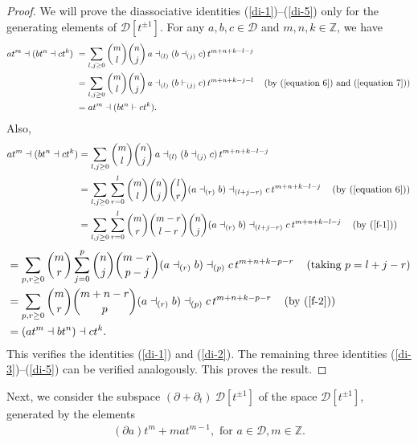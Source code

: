 \documentclass[a4paper,reqno,10pt]{amsart}
\theoremstyle{plain}
\theoremstyle{definition}
\theoremstyle{remark}
\newcommand{\D}{\mathcal{D}}
\begin{document}
\begin{proof}
   We will prove the diassociative identities (\ref{di-1})--(\ref{di-5}) only for the generating elements of $\D[t^{\pm 1} ]$. For any $a,b,c\in\D$ and $m,n,k\in\mathbb{Z}$, we have
    \begin{align*}
         at^{m} \dashv (bt^{n} \dashv ct^{k})  &~= \sum_{l , j \geq 0} \binom{m}{l} \binom{n}{j} ~ \! a\dashv_{(l)} (b \dashv_{(j)} c) ~ \! t^{m+n+k-l-j}\\&
         ~= \sum_{l , j \geq 0 } \binom{m}{l} \binom{n}{j} ~ \!  a\dashv_{(l)} (b \vdash_{(j)}c) ~ \! t^{m+n+k-j-l} \quad \left(\text{by } (\ref{equation 6}) \text{ and } (\ref{equation 7}) \right)\\
         &~=at^{m}\dashv(bt^{n}\vdash ct^{k}).
    \end{align*}
Also,
\begin{align*}
at^{m}\dashv(bt^{n}\dashv ct^{k})
&=\sum_{l,j \geq 0}
\binom{m}{l}\binom{n}{j}
~ \! a\dashv_{(l)}(b\dashv_{(j)}c) ~ \! 
t^{m+n+k-l-j}\\
&=\sum_{l,j \geq 0 }\sum_{r=0}^{l}
\binom{m}{l}\binom{n}{j}\binom{l}{r}
(a\dashv_{(r)}b)
\dashv_{(l+j-r)}c
 ~ \! t^{m+n+k-l-j} \quad  \left(\text{by } (\ref{equation 6})  \right)\\
&=\sum_{l,j \geq 0 }\sum_{r=0}^{l}
\binom{m}{r}\binom{m-r}{l-r}\binom{n}{j}
(a\dashv_{(r)}b)
\dashv_{(l+j-r)}c ~ \!
t^{m+n+k-l-j} \quad   \left(\text{by } (\ref{f-1})  \right)
\end{align*}
\begin{align*}
&=\sum_{p,r \geq 0 }
\binom{m}{r}
\sum_{j=0}^{p}
\binom{n}{j}
\binom{m-r}{p-j}
(a\dashv_{(r)}b)
\dashv_{(p)}c ~ \!
t^{m+n+k-p-r} \quad \left( \text{taking } p=l+j-r \right)\\
&=\sum_{p,r \geq 0 }
\binom{m}{r}
\binom{m+n-r}{p}
(a\dashv_{(r)}b)
\dashv_{(p)}c ~ \! 
t^{m+n+k-p-r} \quad \left(\text{by } (\ref{f-2})  \right)\\
&=(at^{m}\dashv bt^{n})\dashv ct^{k}.
\end{align*}
This verifies the identities (\ref{di-1}) and (\ref{di-2}). The remaining three identities (\ref{di-3})--(\ref{di-5}) can be verified analogously. 
This proves the result.
\end{proof}
Next, we consider the subspace $(\partial+\partial_t) ~ \! \D[t^{\pm1}]$ of the space $\D[t^{\pm1}]$, generated by the elements 
\begin{align*}
    (\partial a)t^m + mat^{m-1}, \text{ for } a\in\D, m\in \mathbb{Z}.
\end{align*}
\end{document}
